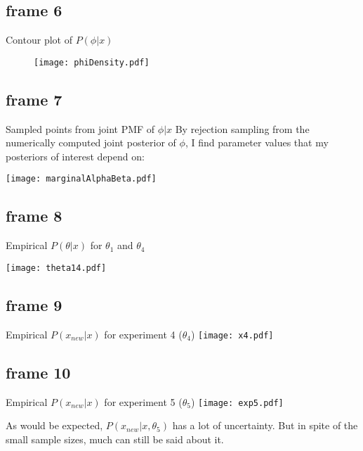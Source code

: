 \documentclass[xcolor=x11names,compress]{beamer}
\renewcommand{\(}{\begin{columns}}
\renewcommand{\)}{\end{columns}}
\newcommand{\<}[1]{\begin{column}{#1}}
\renewcommand{\>}{\end{column}}
\begin{document}
\subsection{frame 6}
\begin{frame}{Contour plot of $P(\phi | x)$}

\begin{figure}%
\texttt{[image: phiDensity.pdf]}
\end{figure}

\end{frame}
\subsection{frame 7}
\begin{frame}{Sampled points from joint PMF of $\phi | x$}
By rejection sampling from the numerically computed joint posterior of $\phi$, I find parameter values that my posteriors of interest depend on:
\begin{center}
\texttt{[image: marginalAlphaBeta.pdf]}
\end{center}
\end{frame}
\subsection{frame 8}
\begin{frame}{Empirical $P(\theta | x)$ for $\theta_1$ and $\theta_4$}
\begin{center}
\texttt{[image: theta14.pdf]}
\end{center}
\end{frame}
\subsection{frame 9}
\begin{frame}{Empirical $P(x_{new} | x)$ for experiment 4 ($\theta_4$)}
\centering
\texttt{[image: x4.pdf]}

\end{frame}
\subsection{frame 10}
\begin{frame}{Empirical $P(x_{new} | x)$ for experiment 5 ($\theta_5$)}
\centering
\texttt{[image: exp5.pdf]}

As would be expected, $P(x_{new} | x, \theta_5)$ has a lot of uncertainty. But in spite of the small sample sizes, much can still be said about it.
\end{frame}
\end{document}
